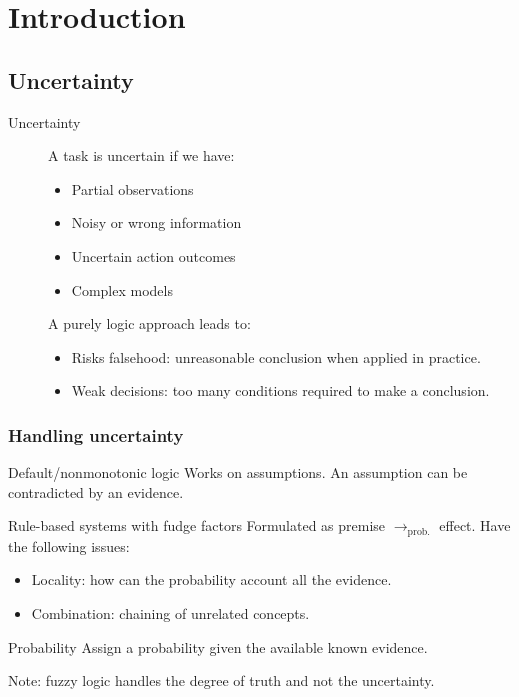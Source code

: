\chapter{Introduction}


\section{Uncertainty}
\begin{description}
    \item[Uncertainty] 
        A task is uncertain if we have:
        \begin{itemize}
            \item Partial observations
            \item Noisy or wrong information
            \item Uncertain action outcomes
            \item Complex models
        \end{itemize}

        A purely logic approach leads to:
        \begin{itemize}
            \item Risks falsehood: unreasonable conclusion when applied in practice.
            \item Weak decisions: too many conditions required to make a conclusion.
        \end{itemize}
\end{description}


\subsection{Handling uncertainty}
\begin{descriptionlist}
    \item[Default/nonmonotonic logic] 
        Works on assumptions.
        An assumption can be contradicted by an evidence.

    \item[Rule-based systems with fudge factors] 
        Formulated as premise $\rightarrow_\text{prob.}$ effect.
        Have the following issues:
        \begin{itemize}
            \item Locality: how can the probability account all the evidence.
            \item Combination: chaining of unrelated concepts.
        \end{itemize}

    \item[Probability] 
        Assign a probability given the available known evidence.

        Note: fuzzy logic handles the degree of truth and not the uncertainty.
\end{descriptionlist}

